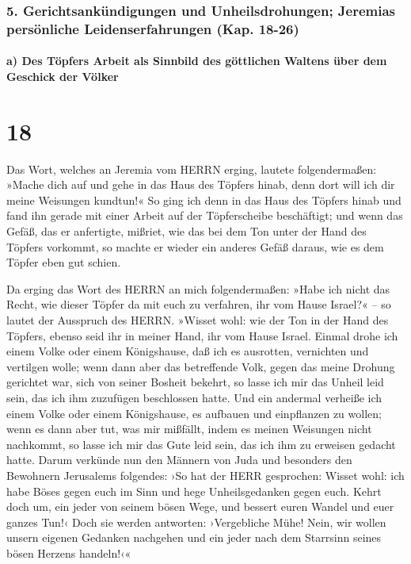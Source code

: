 \hypertarget{gerichtsankuxfcndigungen-und-unheilsdrohungen-jeremias-persuxf6nliche-leidenserfahrungen-kap.-18-26}{%
\subsubsection{5. Gerichtsankündigungen und Unheilsdrohungen; Jeremias
persönliche Leidenserfahrungen (Kap.
18-26)}\label{gerichtsankuxfcndigungen-und-unheilsdrohungen-jeremias-persuxf6nliche-leidenserfahrungen-kap.-18-26}}

\hypertarget{a-des-tuxf6pfers-arbeit-als-sinnbild-des-guxf6ttlichen-waltens-uxfcber-dem-geschick-der-vuxf6lker}{%
\paragraph{a) Des Töpfers Arbeit als Sinnbild des göttlichen Waltens
über dem Geschick der
Völker}\label{a-des-tuxf6pfers-arbeit-als-sinnbild-des-guxf6ttlichen-waltens-uxfcber-dem-geschick-der-vuxf6lker}}

\hypertarget{section-17}{%
\section{18}\label{section-17}}

Das Wort, welches an Jeremia vom HERRN erging, lautete
folgendermaßen: »Mache dich auf und gehe in das Haus des
Töpfers hinab, denn dort will ich dir meine Weisungen kundtun!«
So ging ich denn in das Haus des Töpfers hinab und fand
ihn gerade mit einer Arbeit auf der Töpferscheibe beschäftigt;
und wenn das Gefäß, das er anfertigte, mißriet, wie das
bei dem Ton unter der Hand des Töpfers vorkommt, so machte er wieder ein
anderes Gefäß daraus, wie es dem Töpfer eben gut schien.

Da erging das Wort des HERRN an mich folgendermaßen:
»Habe ich nicht das Recht, wie dieser Töpfer da mit euch
zu verfahren, ihr vom Hause Israel?« -- so lautet der Ausspruch des
HERRN. »Wisset wohl: wie der Ton in der Hand des Töpfers, ebenso seid
ihr in meiner Hand, ihr vom Hause Israel. Einmal drohe ich
einem Volke oder einem Königshause, daß ich es ausrotten, vernichten und
vertilgen wolle; wenn dann aber das betreffende Volk,
gegen das meine Drohung gerichtet war, sich von seiner Bosheit bekehrt,
so lasse ich mir das Unheil leid sein, das ich ihm zuzufügen beschlossen
hatte. Und ein andermal verheiße ich einem Volke oder
einem Königshause, es aufbauen und einpflanzen zu wollen;
wenn es dann aber tut, was mir mißfällt, indem es meinen
Weisungen nicht nachkommt, so lasse ich mir das Gute leid sein, das ich
ihm zu erweisen gedacht hatte. Darum verkünde nun den
Männern von Juda und besonders den Bewohnern Jerusalems folgendes: ›So
hat der HERR gesprochen: Wisset wohl: ich habe Böses gegen euch im Sinn
und hege Unheilsgedanken gegen euch. Kehrt doch um, ein jeder von seinem
bösen Wege, und bessert euren Wandel und euer ganzes Tun!‹
Doch sie werden antworten: ›Vergebliche Mühe! Nein, wir
wollen unsern eigenen Gedanken nachgehen und ein jeder nach dem
Starrsinn seines bösen Herzens handeln!‹«

